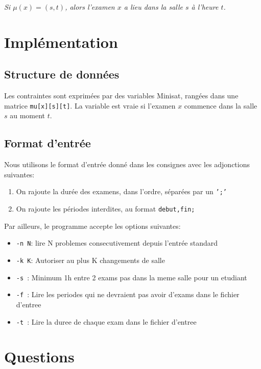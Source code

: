 \documentclass[a4paper]{article}
\begin{document}
\textit{Si $\mu(x) = (s,t)$, alors l'examen $x$ a lieu dans la salle $s$ à l'heure $t$.}

\section{Implémentation}
\subsection{Structure de données}
Les contraintes sont exprimées par des variables Minisat, rangées dans une matrice
\texttt{mu[x][s][t]}. La variable est vraie si l'examen $x$ commence dans la salle
$s$ au moment $t$. 

\subsection{Format d'entrée}
Nous utilisons le format d'entrée donné dans les consignes avec les adjonctions suivantes:
\begin{enumerate}
  \item On rajoute la durée des examens, dans l'ordre, séparées par un \texttt{';'}
  \item On rajoute les périodes interdites, au format \texttt{debut,fin;}
\end{enumerate}

Par ailleurs, le programme accepte les options suivantes:
\begin{itemize}
  \item \texttt{-n N}: lire N problemes consecutivement depuis l'entrée standard
  \item \texttt{-k K}: Autoriser au plus K changements de salle
  \item \texttt{-s  }: Minimum 1h entre 2 exams pas dans la meme salle pour un etudiant
  \item \texttt{-f  }: Lire les periodes qui ne devraient pas avoir d'exams dans le fichier d'entree
  \item \texttt{-t  }: Lire la duree de chaque exam dans le fichier d'entree
\end{itemize}

\section{Questions}
\end{document}
